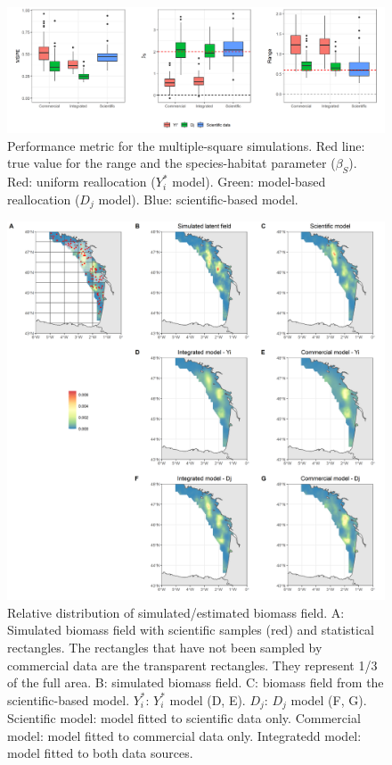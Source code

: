 \documentclass[
  english,
  man,floatsintext]{apa6}
\begin{document}
\begin{figure}
\centering
\includegraphics{images/Perf.metric_multiple_square.png}
\caption{\label{fig:PerfMetricSeveral} Performance metric for the multiple-square simulations. Red line: true value for the range and the species-habitat parameter (\(\beta_S\)). Red: uniform reallocation (\(Y_i^*\) model). Green: model-based reallocation (\(D_j\) model). Blue: scientific-based model.}
\end{figure}

\begin{figure}
\centering
\includegraphics{images/Map_multi_square.png}
\caption{\label{fig:MapSeveral} Relative distribution of simulated/estimated biomass field. A: Simulated biomass field with scientific samples (red) and statistical rectangles. The rectangles that have not been sampled by commercial data are the transparent rectangles. They represent 1/3 of the full area. B: simulated biomass field. C: biomass field from the scientific-based model. \(Y_i^*\): \(Y_i^*\) model (D, E). \(D_j\): \(D_j\) model (F, G). Scientific model: model fitted to scientific data only. Commercial model: model fitted to commercial data only. Integratedd model: model fitted to both data sources.}
\end{figure}
\end{document}
